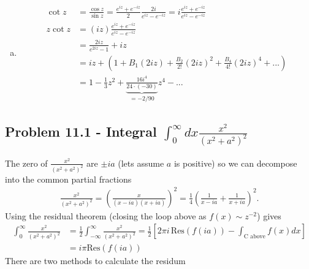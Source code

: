 \documentclass[../main.tex]{subfiles}
\begin{document}
\begin{enumerate}[a)]
\item
\begin{align}
\cot z&=\frac{\cos z}{\sin z}=\frac{e^{iz}+e^{-iz}}{2}\frac{2i}{e^{iz}-e^{-iz}}=i\frac{e^{iz}+e^{-iz}}{e^{iz}-e^{-iz}}\\
z\cot z
&=(iz)\frac{e^{iz}+e^{-iz}}{e^{iz}-e^{-iz}}\\
&=\frac{2iz}{e^{2iz}-1}+iz\\
&=iz+\left(1+B_1(2iz)+\frac{B_2}{2!}(2iz)^2+\frac{B_4}{4!}(2iz)^4+...\right)\\
&=1-\frac{1}{3}z^2+\underbrace{\frac{16i^4}{24\cdot(-30)}}_{=-2/90}z^4-...
\end{align}

\end{enumerate}

\subsection{Problem 11.1 - Integral $\int_0^\infty dx \frac{x^2}{(x^2+a^2)^2}$}
The zero of $\frac{x^2}{(x^2+a^2)^2}$ are $\pm ia$ (lets assume $a$ is positive) so we can decompose into the common partial fractions
\begin{align}
\frac{x^2}{(x^2+a^2)^2}
=\left(\frac{x}{(x-ia)(x+ia)}\right)^2
=\frac{1}{4}\left(\frac{1}{x-ia}+\frac{1}{x+ia}\right)^2.
\end{align}
Using the residual theorem (closing the loop above as $f(x)\sim z^{-2}$) gives
\begin{align}
\int_0^\infty\frac{x^2}{(x^2+a^2)^2}
&=\frac{1}{2}\int_{-\infty}^\infty\frac{x^2}{(x^2+a^2)^2}
=\frac{1}{2}\left[2\pi i\,\text{Res}(f(ia))-\int_\text{C above} f(x)dx\right]\\
&=i\pi \text{Res}(f(ia))
\end{align}
There are two methods to calculate the residum
\end{document}
